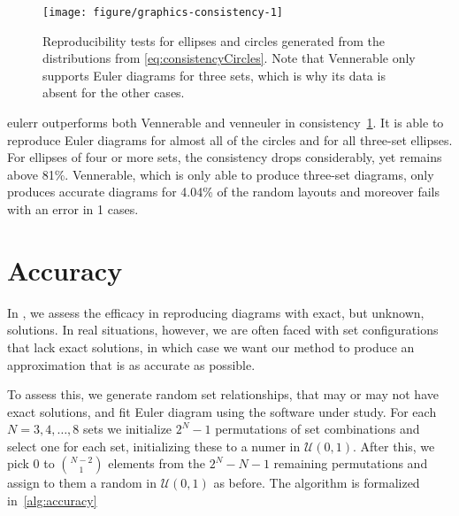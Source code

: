 \documentclass[
  a4paper,
  nofonts,
  nobib,
  nohyper,
  openany
]{tufte-book}\usepackage[]{graphicx}\usepackage[]{color}
\newenvironment{knitrout}{}{} %
\newcommand{\pkg}[1]{{\fontseries{b}\selectfont #1}}
\begin{document}
%
\begin{figure}[hbtp]
\begin{knitrout}
\color{fgcolor}

{\centering \texttt{[image: figure/graphics-consistency-1]} 

}



\end{knitrout}
\caption{Reproducibility tests for ellipses and circles generated from the distributions from \eqref{eq:consistencyCircles}. Note that \pkg{Vennerable} only supports Euler diagrams for three sets, which is why its data is absent for the other cases.}
\label{fig:consistency}
\end{figure}
%



\pkg{eulerr} outperforms both \pkg{Vennerable} and \pkg{venneuler} in consistency~\cref{fig:consistency}. It is able to reproduce Euler diagrams for almost all of the circles and for all three-set ellipses. For ellipses of four or more sets, the consistency drops considerably, yet remains above 81\%. \pkg{Vennerable}, which is only able to produce three-set diagrams, only produces accurate diagrams for 4.04\% of the random layouts and moreover fails with an error in 1 cases.

\section{Accuracy}
\label{sec:accuracy}

In , we assess the efficacy in reproducing diagrams with exact, but unknown, solutions. In real situations, however, we are often faced with set configurations that lack exact solutions, in which case we want our method to produce an approximation that is as accurate as possible.

To assess this, we generate random set relationships, that may or may not have exact solutions, and fit Euler diagram using the software under study. For each $N=3,4,\dots,8$ sets we initialize $2^N-1$ permutations of set combinations and select one for each set, initializing these to a numer in $\mathcal{U}(0, 1)$. After this, we pick 0 to $\binom{N-2}{1}$ elements from the $2^N-N-1$ remaining permutations and assign to them a random in $\mathcal{U}(0, 1)$ as before. The algorithm is formalized in~\cref{alg:accuracy}
\end{document}
